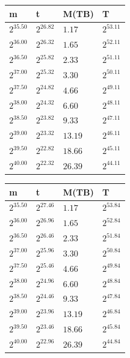 \begin{table}[h!]\centering
  \begin{tabular}{llll}
    m & t & M(TB) & T \\ \hline
    $2^{35.50}$ & $2^{26.82}$ & $1.17$ & $2^{53.11}$ \\
    $2^{36.00}$ & $2^{26.32}$ & $1.65$ & $2^{52.11}$ \\
    $2^{36.50}$ & $2^{25.82}$ & $2.33$ & $2^{51.11}$ \\
    $2^{37.00}$ & $2^{25.32}$ & $3.30$ & $2^{50.11}$ \\
    $2^{37.50}$ & $2^{24.82}$ & $4.66$ & $2^{49.11}$ \\
    $2^{38.00}$ & $2^{24.32}$ & $6.60$ & $2^{48.11}$ \\
    $2^{38.50}$ & $2^{23.82}$ & $9.33$ & $2^{47.11}$ \\
    $2^{39.00}$ & $2^{23.32}$ & $13.19$ & $2^{46.11}$ \\
    $2^{39.50}$ & $2^{22.82}$ & $18.66$ & $2^{45.11}$ \\
    $2^{40.00}$ & $2^{22.32}$ & $26.39$ & $2^{44.11}$ \\
  \end{tabular}
\end{table}

\begin{table}[h!]\centering
  \begin{tabular}{llll}
    m & t & M(TB) & T \\ \hline
    $2^{35.50}$ & $2^{27.46}$ & $1.17$ & $2^{53.84}$ \\
    $2^{36.00}$ & $2^{26.96}$ & $1.65$ & $2^{52.84}$ \\
    $2^{36.50}$ & $2^{26.46}$ & $2.33$ & $2^{51.84}$ \\
    $2^{37.00}$ & $2^{25.96}$ & $3.30$ & $2^{50.84}$ \\
    $2^{37.50}$ & $2^{25.46}$ & $4.66$ & $2^{49.84}$ \\
    $2^{38.00}$ & $2^{24.96}$ & $6.60$ & $2^{48.84}$ \\
    $2^{38.50}$ & $2^{24.46}$ & $9.33$ & $2^{47.84}$ \\
    $2^{39.00}$ & $2^{23.96}$ & $13.19$ & $2^{46.84}$ \\
    $2^{39.50}$ & $2^{23.46}$ & $18.66$ & $2^{45.84}$ \\
    $2^{40.00}$ & $2^{22.96}$ & $26.39$ & $2^{44.84}$ \\
  \end{tabular}
\end{table}

